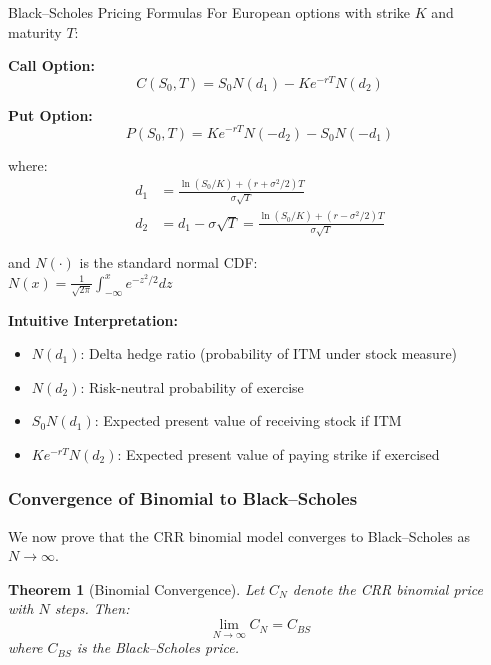 \documentclass[10pt,twocolumn]{article}
\newtheorem{theorem}{Theorem}
\begin{document}
\begin{theorembox}{Black--Scholes Pricing Formulas}
For European options with strike $K$ and maturity $T$:

\textbf{Call Option:}
\begin{equation}
C(S_0, T) = S_0 N(d_1) - Ke^{-rT}N(d_2)
\end{equation}

\textbf{Put Option:}
\begin{equation}
P(S_0, T) = Ke^{-rT}N(-d_2) - S_0 N(-d_1)
\end{equation}

where:
\begin{align}
d_1 &= \frac{\ln(S_0/K) + (r + \sigma^2/2)T}{\sigma\sqrt{T}}\\
d_2 &= d_1 - \sigma\sqrt{T} = \frac{\ln(S_0/K) + (r - \sigma^2/2)T}{\sigma\sqrt{T}}
\end{align}

and $N(\cdot)$ is the standard normal CDF:\\ $N(x) = \frac{1}{\sqrt{2\pi}}\int_{-\infty}^x e^{-z^2/2}dz$
\end{theorembox}

\textbf{Intuitive Interpretation:}
\begin{itemize}[itemsep=2pt]
    \item $N(d_1)$: Delta hedge ratio (probability of ITM under stock measure)
    \item $N(d_2)$: Risk-neutral probability of exercise
    \item $S_0 N(d_1)$: Expected present value of receiving stock if ITM
    \item $Ke^{-rT}N(d_2)$: Expected present value of paying strike if exercised
\end{itemize}

\subsubsection{Convergence of Binomial to Black--Scholes}

We now prove that the CRR binomial model converges to Black--Scholes as $N \to \infty$.

\begin{theorem}[Binomial Convergence]
Let $C_N$ denote the CRR binomial price with $N$ steps. Then:
\begin{equation}
\lim_{N \to \infty} C_N = C_{BS}
\end{equation}
where $C_{BS}$ is the Black--Scholes price.
\end{theorem}
\end{document}
